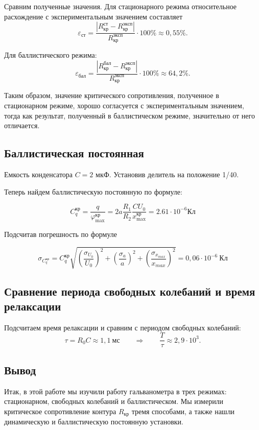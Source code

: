 \documentclass[a4paper, 12pt]{article}
\begin{document}
Сравним полученные значения. Для стационарного режима относительное
расхождение с экспериментальным значением составляет
\[
\varepsilon_{\mathrm{ст}}
=
\frac{\left|R_{\mathrm{кр}}^{\mathrm{ст}}
-R_{\mathrm{кр}}^{\mathrm{эксп}}\right|}
{R_{\mathrm{кр}}^{\mathrm{эксп}}}
\cdot 100\%
\approx
0{,}55\%.
\]

Для баллистического режима:
\[
\varepsilon_{\mathrm{бал}}
=
\frac{\left|R_{\mathrm{кр}}^{\mathrm{бал}}
-R_{\mathrm{кр}}^{\mathrm{эксп}}\right|}
{R_{\mathrm{кр}}^{\mathrm{эксп}}}
\cdot 100\%
\approx
64{,}2\%.
\]

Таким образом, значение критического сопротивления, полученное в
стационарном режиме, хорошо согласуется с экспериментальным значением,
тогда как результат, полученный в баллистическом режиме, значительно
от него отличается.


\subsection{Баллистическая постоянная}

Емкость конденсатора $ C = 2  $ мкФ. Установив делитель на положение 1/40.  

Теперь найдем баллистическую постоянную  по формуле:

\[
C_q^{\mathrm{кр}}
=
\frac{q}{\varphi_{\max}^{\mathrm{кр}}}
=
2a\frac{R_1}{R_2}
\frac{CU_0}{x_{\max}^{\mathrm{кр}}} = 2.61 \cdot 10^{-6} \text{Кл}
\]

Подсчитав погрешность по формуле 

\[
\sigma_{C_q^{\mathrm{кр}}}
=
C_q^{\mathrm{кр}}
\sqrt{
\left(\frac{\sigma_{U_0}}{U_0}\right)^2
+
\left(\frac{\sigma_a}{a}\right)^2
+
\left(\frac{\sigma_{x_{max}}}{x_{max}}\right)^2
}
=
0{,}06\cdot10^{-6}\ \text{Кл}
\]

\subsection{Сравнение периода свободных колебаний и время релаксации}

Подсчитаем время релаксации и сравним с периодом свободных колебаний:
\[
\tau = R_0 C \approx 1{,}1\ \text{мс}
\qquad\Rightarrow\qquad
\frac{T}{\tau}\approx 2{,}9\cdot10^3.
\]

\subsection{Вывод}

Итак, в этой работе мы изучили работу гальванометра в трех режимах: стационарном, свободных колебаний и баллистическом. Мы измерили критическое сопротивление контура $ R_{кр} $ тремя способами, а также нашли динамическую и баллистическую постоянную установки. 
\end{document}
